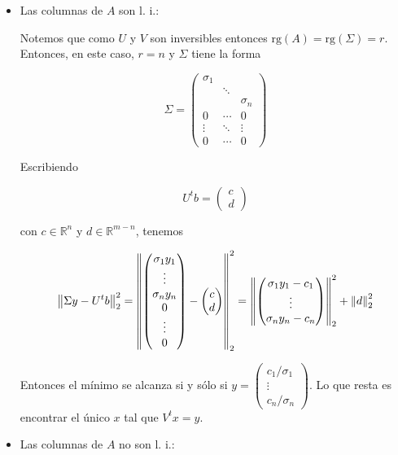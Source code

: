 \begin{itemize}
\item Las columnas de $A$ son l. i.:

Notemos que como $U$ y $V$ son inversibles entonces $\text{rg}(A) = \text{rg}(\Sigma) = r$. Entonces, en este caso, $r = n$ y $\Sigma$ tiene la forma

\[\Sigma = \begin{pmatrix}
\sigma_1 	& 			& 		\\
			& \ddots 	& 		\\
			&			&\sigma_n \\
0			& \cdots		& 0\\
\vdots		& \ddots		& \vdots\\
0			& \cdots		& 0
\end{pmatrix}\]

Escribiendo

\[U^t b = \begin{pmatrix}
c \\ d
\end{pmatrix}\]

con $c \in \mathbb{R}^n$ y $d \in \mathbb{R}^{m - n}$, tenemos

\[\left\lVert\Sigma y - U^tb\right\rVert_2^2 = \left\lVert\begin{pmatrix}
\sigma_1 y_1 \\
\vdots \\
\sigma_n y_n \\
0 \\
\vdots \\
0
\end{pmatrix} - \begin{pmatrix}
c \\
d
\end{pmatrix}\right\rVert_2^2 = \left\lVert\begin{pmatrix}
\sigma_1 y_1 - c_1\\
\vdots \\
\sigma_n y_n - c_n
\end{pmatrix}\right\rVert_2^2 + \left\lVert d\right\rVert_2^2
\]

Entonces el mínimo se alcanza si y sólo si $y = \begin{pmatrix}c_1 / \sigma_1 \\ \vdots \\ c_n / \sigma_n \end{pmatrix}$. Lo que resta es encontrar el único $x$ tal que $V^t x = y$.

\item Las columnas de $A$ no son l. i.:


\end{itemize}
